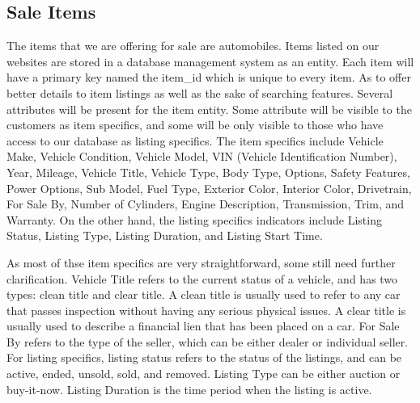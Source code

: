 \documentclass[12pt]{article}
\begin{document}
\subsection{Sale Items}
The items that we are offering for sale are automobiles. Items listed on our websites are stored in a database management system as an entity. Each item will have a primary key named the item\_id which is unique to every item. As to offer better details to item listings as well as the sake of searching features. Several attributes will be present for the item entity. Some attribute will be visible to the customers as item specifics, and some will be only visible to those who have access to our database as listing specifics. The item specifics include Vehicle Make, Vehicle Condition, Vehicle Model, VIN (Vehicle Identification Number), Year, Mileage, Vehicle Title, Vehicle Type, Body Type, Options, Safety Features, Power Options, Sub Model, Fuel Type, Exterior Color, Interior Color, Drivetrain, For Sale By, Number of Cylinders, Engine Description, Transmission, Trim, and Warranty. On the other hand, the listing specifics indicators include Listing Status, Listing Type, Listing Duration, and Listing Start Time.\par
As most of thse item specifics are very straightforward, some still need further clarification. Vehicle Title refers to the current status of a vehicle, and has two types: clean title and clear title. A clean title is usually used to refer to any car that passes inspection without having any serious physical issues. A clear title is usually used to describe a financial lien that has been placed on a car. For Sale By refers to the type of the seller, which can be either dealer or individual seller. For listing specifics, listing status refers to the status of the listings, and can be active, ended, unsold, sold, and removed. Listing Type can be either auction or buy-it-now. Listing Duration is the time period when the listing is active.
\end{document}
